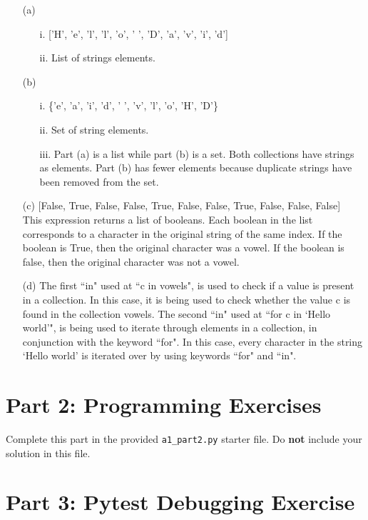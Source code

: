 \documentclass[fontsize=11pt]{article}
\begin{document}
\begin{enumerate}
\begin{enumerate}
\item[(a)]
\begin{enumerate}
    \item[i.] ['H', 'e', 'l', 'l', 'o', ' ', 'D', 'a', 'v', 'i', 'd']
    \item[ii.] List of strings elements.
\end{enumerate}
\item[(b)]
\begin{enumerate}
    \item[i.] \{'e', 'a', 'i', 'd', ' ', 'v', 'l', 'o', 'H', 'D'\}
    \item[ii.] Set of string elements.
    \item[iii.] Part (a) is a list while part (b) is a set. Both collections have strings as elements. Part (b) has fewer elements because duplicate strings have been removed from the set.
\end{enumerate}
\item[(c)]
[False, True, False, False, True, False, False, True, False, False, False]
\\This expression returns a list of booleans. Each boolean in the list corresponds to a character in the original string of the same index. If the boolean is True, then the original character was a vowel. If the boolean is false, then the original character was not a vowel.
\item[(d)]
The first ``in" used at ``c in vowels", is used to check if a value is present in a collection. In this case, it is being used to check whether the value c is found in the collection vowels. The second ``in" used at ``for c in `Hello world'", is being used to iterate through elements in a collection, in conjunction with the keyword ``for". In this case, every character in the string `Hello world' is iterated over by using keywords ``for" and ``in".
\end{enumerate}
\end{enumerate}

\section*{Part 2: Programming Exercises}

Complete this part in the provided \texttt{a1\_part2.py} starter file.
Do \textbf{not} include your solution in this file.

\section*{Part 3: Pytest Debugging Exercise}
\end{document}
